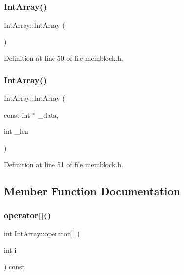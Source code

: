 \subsubsection{\texorpdfstring{Int\+Array()}{IntArray()}\hspace{0.1cm}{\footnotesize\ttfamily [1/2]}}
{\footnotesize\ttfamily Int\+Array\+::\+Int\+Array (\begin{DoxyParamCaption}{ }\end{DoxyParamCaption})\hspace{0.3cm}{\ttfamily [inline]}}



Definition at line 50 of file memblock.\+h.

\mbox{\label{class_int_array_af85a1df528aca0755e211fb57939eabd}} 
\subsubsection{\texorpdfstring{Int\+Array()}{IntArray()}\hspace{0.1cm}{\footnotesize\ttfamily [2/2]}}
{\footnotesize\ttfamily Int\+Array\+::\+Int\+Array (\begin{DoxyParamCaption}\item[{const int $\ast$}]{\+\_\+data,  }\item[{int}]{\+\_\+len }\end{DoxyParamCaption})\hspace{0.3cm}{\ttfamily [inline]}}



Definition at line 51 of file memblock.\+h.



\subsection{Member Function Documentation}
\mbox{\label{class_int_array_a9ec7c594eacbc68f4e4de9725223488d}} 
\subsubsection{\texorpdfstring{operator[]()}{operator[]()}}
{\footnotesize\ttfamily int Int\+Array\+::operator\mbox{[}$\,$\mbox{]} (\begin{DoxyParamCaption}\item[{int}]{i }\end{DoxyParamCaption}) const\hspace{0.3cm}{\ttfamily [inline]}}



